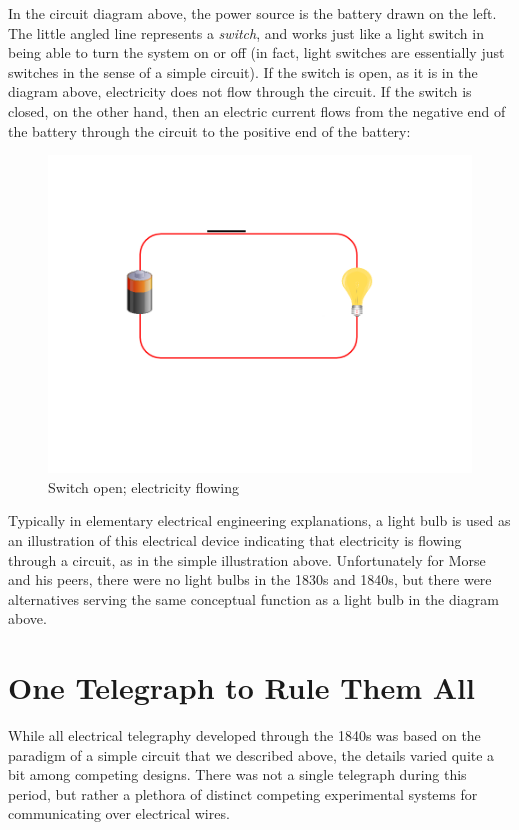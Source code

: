 \documentclass[UTF8]{book}
\begin{document}
\begin{CJK}{UTF8}{gbsn}
In the circuit diagram above, the power source is the battery drawn on the left. The little angled line represents a \emph{switch}, and works just like a light switch in being able to turn the system on or off (in fact, light switches are essentially just switches in the sense of a simple circuit). If the switch is open, as it is in the diagram above, electricity does not flow through the circuit. If the switch is closed, on the other hand, then an electric current flows from the negative end of the battery through the circuit to the positive end of the battery:

\begin{figure}[H]
\centering
\includegraphics[width=0.8\linewidth]{circuit2}
\caption{Switch open; electricity flowing}
\end{figure}

Typically in elementary electrical engineering explanations, a light bulb is used as an illustration of this electrical device indicating that electricity is flowing through a circuit, as in the simple illustration above. Unfortunately for Morse and his peers, there were no light bulbs in the 1830s and 1840s, but there were alternatives serving the same conceptual function as a light bulb in the diagram above.

\section{One Telegraph to Rule Them All}

While all electrical telegraphy developed through the 1840s was based on the paradigm of a simple circuit that we described above, the details varied quite a bit among competing designs. There was not a single telegraph during this period, but rather a plethora of distinct competing experimental systems for communicating over electrical wires.


\end{CJK}
\end{document}
